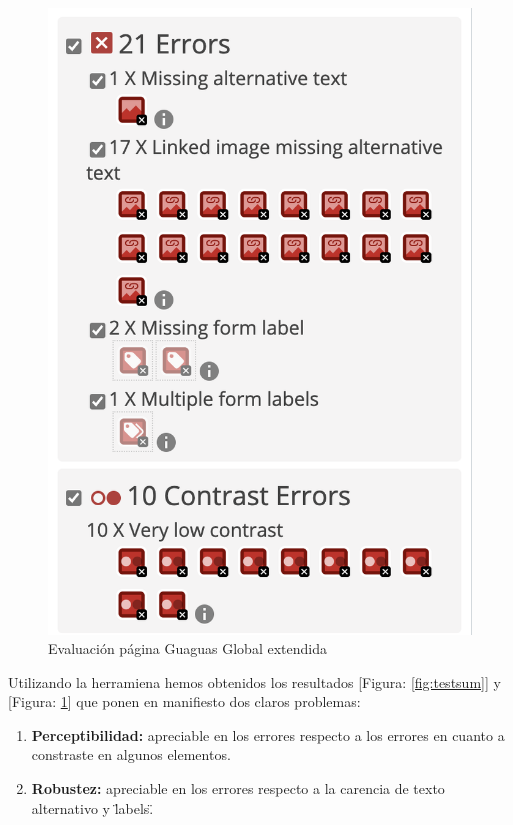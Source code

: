 \documentclass{article}
\begin{document}
        \begin{figure}
            \centerline{\includegraphics[scale=0.3]{guaguasglobalext}}
            \caption{Evaluación página Guaguas Global extendida}
            \label{fig:testext}
        \end{figure}

        Utilizando la herramiena \cite[WAVE]{wave} hemos obtenidos los resultados
         [Figura: \ref{fig:testsum}] y [Figura: \ref{fig:testext}] que ponen en 
         manifiesto dos claros problemas:
         
         \begin{enumerate}
            \item \textbf{Perceptibilidad:} apreciable en los errores respecto a 
                los errores en cuanto a constraste en algunos elementos.
            \item \textbf{Robustez:} apreciable en los errores respecto a la
                carencia de texto alternativo y \"labels\".
         \end{enumerate}
\end{document}
